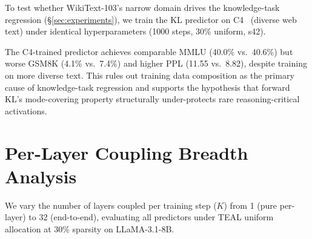 To test whether WikiText-103's narrow domain drives the knowledge-task regression (\S\ref{sec:experiments}), we train the KL predictor on C4~\cite{raffel2020c4} (diverse web text) under identical hyperparameters (1000 steps, 30\% uniform, s42).

\begin{table}[h]
\centering
\caption{C4-trained vs.\ WikiText-trained KL predictor (LLaMA-3.1-8B, 30\% uniform, s42).}
\label{tab:c4_control}
\end{table}

The C4-trained predictor achieves comparable MMLU (40.0\% vs.\ 40.6\%) but worse GSM8K (4.1\% vs.\ 7.4\%) and higher PPL (11.55 vs.\ 8.82), despite training on more diverse text.
This rules out training data composition as the primary cause of knowledge-task regression and supports the hypothesis that forward KL's mode-covering property structurally under-protects rare reasoning-critical activations. %

\section{Per-Layer Coupling Breadth Analysis}
\label{app:k_curve}

We vary the number of layers coupled per training step ($K$) from 1 (pure per-layer) to 32 (end-to-end), evaluating all predictors under TEAL uniform allocation at 30\% sparsity on LLaMA-3.1-8B.

